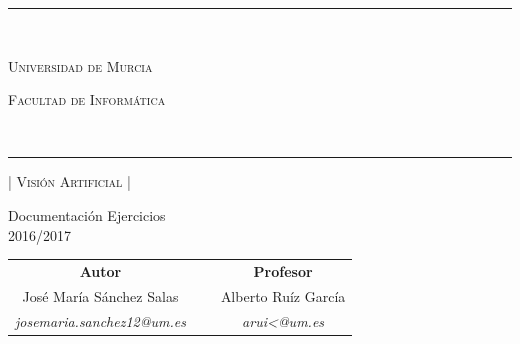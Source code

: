 \documentclass[a4paper,10pt,titlepage,oneside,openright]{book}
\begin{document}
\begin{center}
\rule{150mm}{0.1mm} \\
\vspace{5mm}
\begin{Huge}
 \textsc{Universidad de Murcia}\\ \vspace{10mm}
\end{Huge}
\begin{huge}
 \textsc{Facultad de Informática}
\end{huge}
\vspace{5mm} \\
\rule{150mm}{0.5mm}

\vspace{10mm}

\begin{Huge}
  \textsc{| Visión Artificial |} \\ \vspace{10mm}
\end{Huge}

\begin{LARGE}
 Documentación Ejercicios\\ \vspace{3mm}
 {\large 2016/2017}
\end{LARGE}

\vspace{25mm}

\begin{Large}
\begin{center}
\begin{tabular}{ccc}
\textbf{Autor} & ~ & \textbf{Profesor}\\
José María Sánchez Salas & ~ & Alberto Ruíz García\\
\textit{josemaria.sanchez12@um.es} & ~ & \textit{arui<@um.es}
\end{tabular}
\end{center}
\end{Large}
\end{center}
\newpage
\thispagestyle{empty}
\section*{}
\newpage

\thispagestyle{empty}

\tableofcontents
{}

\newpage
\thispagestyle{empty}
\end{document}
